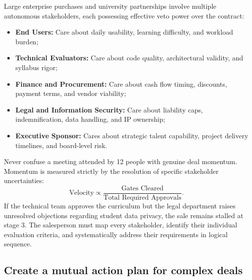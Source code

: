 Large enterprise purchases and university partnerships involve multiple autonomous stakeholders, each possessing effective veto power over the contract:
\begin{itemize}
\item \textbf{End Users:} Care about daily usability, learning difficulty, and workload burden;
\item \textbf{Technical Evaluators:} Care about code quality, architectural validity, and syllabus rigor;
\item \textbf{Finance and Procurement:} Care about cash flow timing, discounts, payment terms, and vendor viability;
\item \textbf{Legal and Information Security:} Care about liability caps, indemnification, data handling, and IP ownership;
\item \textbf{Executive Sponsor:} Cares about strategic talent capability, project delivery timelines, and board-level risk.
\end{itemize}
Never confuse a meeting attended by 12 people with genuine deal momentum. Momentum is measured strictly by the resolution of specific stakeholder uncertainties:
\begin{equation}
\text{Velocity} \propto \frac{\text{Gates Cleared}}{\text{Total Required Approvals}}.
\end{equation}
If the technical team approves the curriculum but the legal department raises unresolved objections regarding student data privacy, the sale remains stalled at stage 3. The salesperson must map every stakeholder, identify their individual evaluation criteria, and systematically address their requirements in logical sequence.

\subsection{Create a mutual action plan for complex deals}

